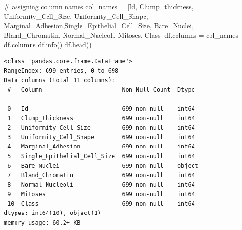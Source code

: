 \documentclass[
  letterpaper,
  DIV=11,
  numbers=noendperiod]{scrreprt}
\newenvironment{Shaded}{\begin{snugshade}}{\end{snugshade}}
\newcommand{\CommentTok}[1]{\textcolor[rgb]{0.37,0.37,0.37}{#1}}
\newcommand{\NormalTok}[1]{\textcolor[rgb]{0.00,0.23,0.31}{#1}}
\newcommand{\OperatorTok}[1]{\textcolor[rgb]{0.37,0.37,0.37}{#1}}
\newcommand{\StringTok}[1]{\textcolor[rgb]{0.13,0.47,0.30}{#1}}
\begin{document}
\begin{Shaded}
\begin{Highlighting}[]
\CommentTok{\# assigning column names }
\NormalTok{col\_names }\OperatorTok{=}\NormalTok{ [}\StringTok{\textquotesingle{}Id\textquotesingle{}}\NormalTok{, }\StringTok{\textquotesingle{}Clump\_thickness\textquotesingle{}}\NormalTok{, }\StringTok{\textquotesingle{}Uniformity\_Cell\_Size\textquotesingle{}}\NormalTok{, }\StringTok{\textquotesingle{}Uniformity\_Cell\_Shape\textquotesingle{}}\NormalTok{, }\StringTok{\textquotesingle{}Marginal\_Adhesion\textquotesingle{}}\NormalTok{,}\StringTok{\textquotesingle{}Single\_Epithelial\_Cell\_Size\textquotesingle{}}\NormalTok{, }\StringTok{\textquotesingle{}Bare\_Nuclei\textquotesingle{}}\NormalTok{, }\StringTok{\textquotesingle{}Bland\_Chromatin\textquotesingle{}}\NormalTok{, }\StringTok{\textquotesingle{}Normal\_Nucleoli\textquotesingle{}}\NormalTok{, }\StringTok{\textquotesingle{}Mitoses\textquotesingle{}}\NormalTok{, }\StringTok{\textquotesingle{}Class\textquotesingle{}}\NormalTok{]}
\NormalTok{df.columns }\OperatorTok{=}\NormalTok{ col\_names}
\NormalTok{df.columns}
\NormalTok{df.info()}
\NormalTok{df.head()}
\end{Highlighting}
\end{Shaded}

\begin{verbatim}
<class 'pandas.core.frame.DataFrame'>
RangeIndex: 699 entries, 0 to 698
Data columns (total 11 columns):
 #   Column                       Non-Null Count  Dtype 
---  ------                       --------------  ----- 
 0   Id                           699 non-null    int64 
 1   Clump_thickness              699 non-null    int64 
 2   Uniformity_Cell_Size         699 non-null    int64 
 3   Uniformity_Cell_Shape        699 non-null    int64 
 4   Marginal_Adhesion            699 non-null    int64 
 5   Single_Epithelial_Cell_Size  699 non-null    int64 
 6   Bare_Nuclei                  699 non-null    object
 7   Bland_Chromatin              699 non-null    int64 
 8   Normal_Nucleoli              699 non-null    int64 
 9   Mitoses                      699 non-null    int64 
 10  Class                        699 non-null    int64 
dtypes: int64(10), object(1)
memory usage: 60.2+ KB
\end{verbatim}
\end{document}
